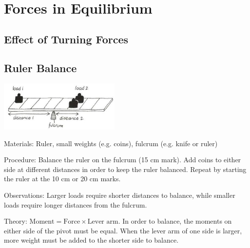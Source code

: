 \section{Forces in Equilibrium}

\begin{multicols}{2}


\section*{Effect of Turning Forces}


\subsection{Ruler Balance}

\begin{center}
\includegraphics[width=0.45\textwidth]{./img/vso/lever-balance.jpg}
\end{center}

\begin{description*}
\item[Materials:]{Ruler, small weights (e.g. coins), fulcrum (e.g. knife or ruler)}
\item[Procedure:]{Balance the ruler on the fulcrum (15 cm mark). Add coins to either side at different distances in order to keep the ruler balanced. Repeat by starting the ruler at the 10 cm or 20 cm marks.}
\item[Observations:]{Larger loads require shorter distances to balance, while smaller loads require longer distances from the fulcrum.}
\item[Theory:]{$\text{Moment} = \text{Force} \times \text{Lever arm}$. In order to balance, the moments on either side of the pivot must be equal. When the lever arm of one side is larger, more weight must be added to the shorter side to balance.}
\end{description*}


\end{multicols}
